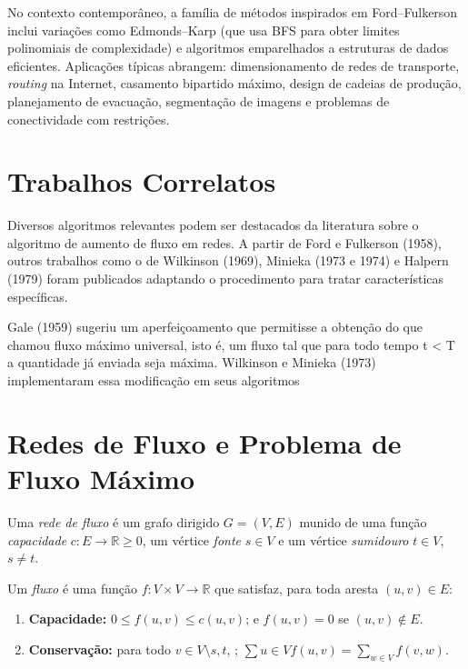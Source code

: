 \documentclass[12pt]{article}
\begin{document}
No contexto contemporâneo, a família de métodos inspirados em Ford–Fulkerson inclui variações como Edmonds–Karp (que usa BFS para obter limites polinomiais de complexidade) e algoritmos emparelhados a estruturas de dados eficientes. Aplicações típicas abrangem: dimensionamento de redes de transporte, \emph{routing} na Internet, casamento bipartido máximo, design de cadeias de produção, planejamento de evacuação, segmentação de imagens e problemas de conectividade com restrições.


\section{Trabalhos Correlatos} \label{sec:firstpage}

Diversos algoritmos relevantes podem ser destacados da literatura sobre o algoritmo de aumento de fluxo em redes. A partir de Ford e Fulkerson (1958), outros trabalhos como o de Wilkinson (1969), Minieka (1973 e 1974) e Halpern (1979) foram publicados adaptando o procedimento para tratar características específicas.\vskip0.3cm

Gale (1959) sugeriu um aperfeiçoamento que permitisse a obtenção do que chamou fluxo máximo universal, isto é, um fluxo tal que para todo tempo t < T a quantidade já enviada seja máxima. Wilkinson e Minieka (1973) implementaram essa modificação em seus algoritmos







\section{Redes de Fluxo e Problema de Fluxo Máximo} 

Uma \emph{rede de fluxo} é um grafo dirigido $G=(V,E)$ munido de uma função \emph{capacidade} $c: E \to \mathbb{R}{\ge 0}$, um vértice \emph{fonte} $s\in V$ e um vértice \emph{sumidouro} $t\in V$, $s\neq t$. 

Um \emph{fluxo} é uma função $f: V\times V \to \mathbb{R}$ que satisfaz, para toda aresta $(u,v)\in E$: 

\begin{enumerate}
    \item \textbf{Capacidade:} $0 \le f(u,v) \le c(u,v)$; e $f(u,v)=0$ se $(u,v)\notin E$. 
    \item \textbf{Conservação:} para todo $v\in V\setminus{s,t}$, ; $\sum\limits{u\in V} f(u,v) = \sum\limits_{w\in V} f(v,w)$. 
\end{enumerate} 
    
\end{document}

